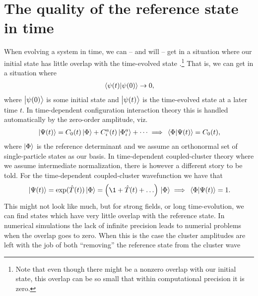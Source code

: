     \section{The quality of the reference state in time}
        \label{sec:cc-phase}
        When evolving a system in time, we can -- and will -- get in a
        situation where our initial state has little overlap with the
        time-evolved state \cite{pedersen2018symplectic}.\footnote{%
            Note that even though there might be a nonzero overlap with our
            initial state, this overlap can be so small that within
            computational precision it is zero.
        }
        That is, we can get in a situation where
        \begin{align}
            \braket*{\psi(t)}{\psi(0)} \to 0,
        \end{align}
        where $\ket{\psi(0)}$ is some initial state and $\ket{\psi(t)}$ is
        the time-evolved state at a later time $t$.
        In time-dependent configuration interaction theory this is handled
        automatically by the zero-order amplitude, viz.
        \begin{gather}
            \ket*{\Psi(t)}
            = C_0(t)\ket*{\Phi}
            + C^{a}_{i}(t)\ket*{\Phi^{a}_{i}}
            + \dots
            \implies
            \braket*{\Phi}{\Psi(t)} = C_0(t),
        \end{gather}
        where $\ket{\Phi}$ is the reference determinant and we assume an
        orthonormal set of single-particle states as our basis.
        In time-dependent coupled-cluster theory where we assume
        intermediate normalization, there is however a different story to be
        told.
        For the time-dependent coupled-cluster wavefunction we have that
        \begin{gather}
            \ket*{\Psi(t)}
            = \exponential(\clust(t))\ket*{\slat}
            = \para{
                \1
                + \clust(t)
                + \dots
            }\ket*{\slat}
            \implies
            \braket*{\slat}{\Psi(t)} = 1.
        \end{gather}
        This might not look like much, but for strong fields, or long
        time-evolution, we can find states which have very little overlap
        with the reference state.
        In numerical simulations the lack of infinite precision leads to
        numerial problems when the overlap goes to zero.
        When this is the case the cluster amplitudes are left with the job
        of both ``removing'' the reference state from the cluster wave
